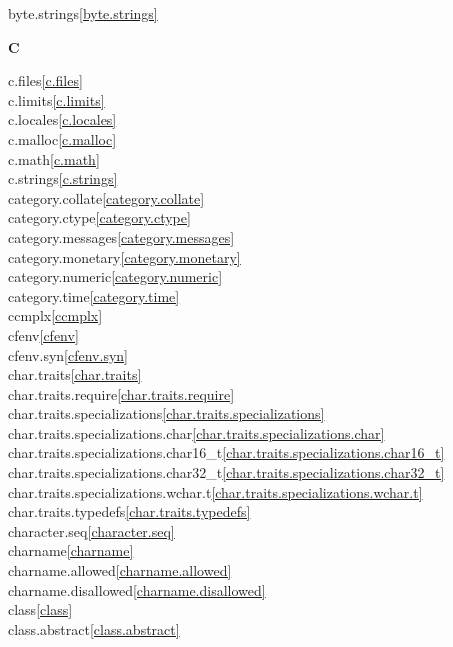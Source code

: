 \begin{multicols}{2}
byte.strings\quad\ref{byte.strings}\\
\par \textbf{C}\par
c.files\quad\ref{c.files}\\
c.limits\quad\ref{c.limits}\\
c.locales\quad\ref{c.locales}\\
c.malloc\quad\ref{c.malloc}\\
c.math\quad\ref{c.math}\\
c.strings\quad\ref{c.strings}\\
category.collate\quad\ref{category.collate}\\
category.ctype\quad\ref{category.ctype}\\
category.messages\quad\ref{category.messages}\\
category.monetary\quad\ref{category.monetary}\\
category.numeric\quad\ref{category.numeric}\\
category.time\quad\ref{category.time}\\
ccmplx\quad\ref{ccmplx}\\
cfenv\quad\ref{cfenv}\\
cfenv.syn\quad\ref{cfenv.syn}\\
char.traits\quad\ref{char.traits}\\
char.traits.require\quad\ref{char.traits.require}\\
char.traits.specializations\quad\ref{char.traits.specializations}\\
char.traits.specializations.char\quad\ref{char.traits.specializations.char}\\
char.traits.specializations.char16_t\quad\ref{char.traits.specializations.char16_t}\\
char.traits.specializations.char32_t\quad\ref{char.traits.specializations.char32_t}\\
char.traits.specializations.wchar.t\quad\ref{char.traits.specializations.wchar.t}\\
char.traits.typedefs\quad\ref{char.traits.typedefs}\\
character.seq\quad\ref{character.seq}\\
charname\quad\ref{charname}\\
charname.allowed\quad\ref{charname.allowed}\\
charname.disallowed\quad\ref{charname.disallowed}\\
class\quad\ref{class}\\
class.abstract\quad\ref{class.abstract}\\

\end{multicols}
